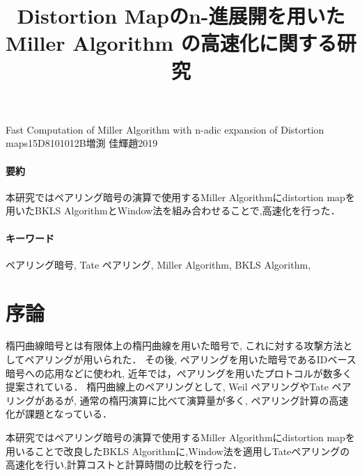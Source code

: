 \documentclass[twocolumn]{jsarticle} %
\begin{document}
\title{Distortion Mapのn-進展開を用いた \\ Miller Algorithm の高速化に関する研究}{Fast Computation of Miller Algorithm with n-adic expansion of Distortion maps}{15D8101012B}{増渕 佳輝}{趙}{2019}
\vspace{-5cm}
\paragraph{要約}
本研究ではペアリング暗号の演算で使用するMiller Algorithmにdistortion mapを用いたBKLS AlgorithmとWindow法を組み合わせることで,高速化を行った．
\vspace{-2mm}
\paragraph{キーワード}
ペアリング暗号, Tate ペアリング, Miller Algorithm, BKLS Algorithm,
\vspace{-5mm}
\section{序論}


楕円曲線暗号とは有限体上の楕円曲線を用いた暗号で, これに対する攻撃方法としてペアリングが用いられた． その後, ペアリングを用いた暗号であるIDベース暗号への応用などに使われ,
近年では，ペアリングを用いたプロトコルが数多く提案されている．
楕円曲線上のペアリングとして,
Weil ペアリングやTate ペアリングがあるが, 通常の楕円演算に比べて演算量が多く, ペアリング計算の高速化が課題となっている．
\par

本研究ではペアリング暗号の演算で使用するMiller Algorithmにdistortion mapを用いることで改良したBKLS Algorithmに,Window法を適用しTateペアリングの高速化を行い,計算コストと計算時間の比較を行った．
\end{document}
